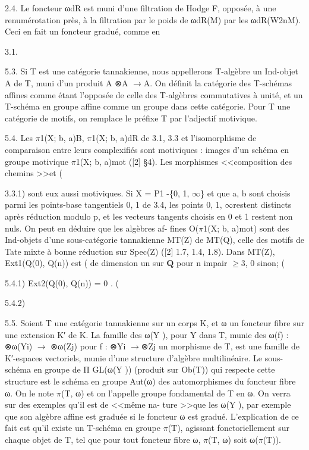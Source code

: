\documentclass[11pt]{article}
\begin{document}
2.4. Le foncteur ωdR est muni d’une filtration de Hodge F, opposée, à une renumérotation près, à la filtration par le poids de ωdR(M) par les ωdR(W2nM). Ceci en fait un foncteur gradué, comme en 

3.1. 

5.3. Si T est une catégorie tannakienne, nous appellerons T-algèbre un Ind-objet A de T, muni d’un produit A ⊗A \(\to\)A. On définit la catégorie des T-schémas affines comme étant l’opposée de celle des T-algèbres commutatives à unité, et un T-schéma en groupe affine comme un groupe dans cette catégorie. Pour T une catégorie de motifs, on remplace le préfixe T par l’adjectif motivique. 

5.4. Les \(\pi\)1(X; b, a)B, \(\pi\)1(X; b, a)dR de 3.1, 3.3 et l’isomorphisme de comparaison entre leurs complexifiés sont motiviques : images d’un schéma en groupe motivique \(\pi\)1(X; b, a)mot ([2] §4). Les morphismes <<composition des chemins >>et (

3.3.1) sont eux aussi motiviques. Si X = P1 -\{0, 1, \(\infty\)\} et que a, b sont choisis parmi les points-base tangentiels 0, 1 de 3.4, les points 0, 1, \(\infty\)restent distincts après réduction modulo p, et les vecteurs tangents choisis en 0 et 1 restent non nuls. On peut en déduire que les algèbres af- fines O(\(\pi\)1(X; b, a)mot) sont des Ind-objets d’une sous-catégorie tannakienne MT(Z) de MT(Q), celle des motifs de Tate mixte à bonne réduction sur Spec(Z) ([2] 1.7, 1.4, 1.8). Dans MT(Z), Ext1(Q(0), Q(n)) est ( de dimension un sur \(\mathbf Q\) pour n impair \(\ge\)3, 0 sinon; (

5.4.1) Ext2(Q(0), Q(n)) = 0 . (

5.4.2) 

5.5. Soient T une catégorie tannakienne sur un corps K, et ω un foncteur fibre sur une extension K′ de K. La famille des ω(Y ), pour Y dans T, munie des ω(f) : ⊗ω(Yi) \(\to\) ⊗ω(Zj) pour f : ⊗Yi \(\to\)⊗Zj un morphisme de T, est une famille de K′-espaces vectoriels, munie d’une structure d’algèbre multilinéaire. Le sous-schéma en groupe de Π GL(ω(Y )) (produit sur Ob(T)) qui respecte cette structure est le schéma en groupe Aut(ω) des automorphismes du foncteur fibre ω. On le note \(\pi\)(T, ω) et on l’appelle groupe fondamental de T en ω. On verra sur des exemples qu’il est de <<même na- ture >>que les ω(Y ), par exemple que son algèbre affine est graduée si le foncteur ω est gradué. L’explication de ce fait est qu’il existe un T-schéma en groupe \(\pi\)(T), agissant fonctoriellement sur chaque objet de T, tel que pour tout foncteur fibre ω, \(\pi\)(T, ω) soit ω(\(\pi\)(T)).
\end{document}
